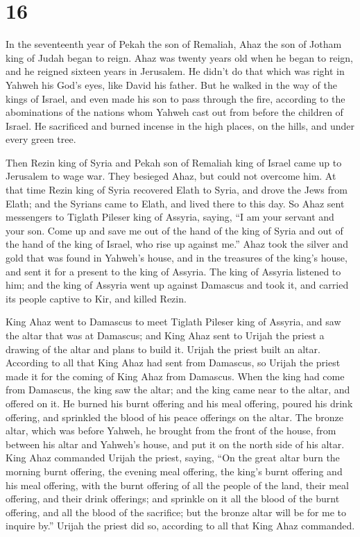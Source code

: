 \hypertarget{section-15}{%
\section{16}\label{section-15}}

 In the seventeenth year of Pekah the son of Remaliah,
Ahaz the son of Jotham king of Judah began to reign.  Ahaz
was twenty years old when he began to reign, and he reigned sixteen
years in Jerusalem. He didn't do that which was right in Yahweh his
God's eyes, like David his father.  But he walked in the
way of the kings of Israel, and even made his son to pass through the
fire, according to the abominations of the nations whom Yahweh cast out
from before the children of Israel.  He sacrificed and
burned incense in the high places, on the hills, and under every green
tree.

 Then Rezin king of Syria and Pekah son of Remaliah king
of Israel came up to Jerusalem to wage war. They besieged Ahaz, but
could not overcome him.  At that time Rezin king of Syria
recovered Elath to Syria, and drove the Jews from Elath; and the Syrians
came to Elath, and lived there to this day.  So Ahaz sent
messengers to Tiglath Pileser king of Assyria, saying, ``I am your
servant and your son. Come up and save me out of the hand of the king of
Syria and out of the hand of the king of Israel, who rise up against
me.''  Ahaz took the silver and gold that was found in
Yahweh's house, and in the treasures of the king's house, and sent it
for a present to the king of Assyria.  The king of Assyria
listened to him; and the king of Assyria went up against Damascus and
took it, and carried its people captive to Kir, and killed Rezin.

 King Ahaz went to Damascus to meet Tiglath Pileser king
of Assyria, and saw the altar that was at Damascus; and King Ahaz sent
to Urijah the priest a drawing of the altar and plans to build it.
 Urijah the priest built an altar. According to all that
King Ahaz had sent from Damascus, so Urijah the priest made it for the
coming of King Ahaz from Damascus.  When the king had
come from Damascus, the king saw the altar; and the king came near to
the altar, and offered on it.  He burned his burnt
offering and his meal offering, poured his drink offering, and sprinkled
the blood of his peace offerings on the altar.  The
bronze altar, which was before Yahweh, he brought from the front of the
house, from between his altar and Yahweh's house, and put it on the
north side of his altar.  King Ahaz commanded Urijah the
priest, saying, ``On the great altar burn the morning burnt offering,
the evening meal offering, the king's burnt offering and his meal
offering, with the burnt offering of all the people of the land, their
meal offering, and their drink offerings; and sprinkle on it all the
blood of the burnt offering, and all the blood of the sacrifice; but the
bronze altar will be for me to inquire by.''  Urijah the
priest did so, according to all that King Ahaz commanded.


